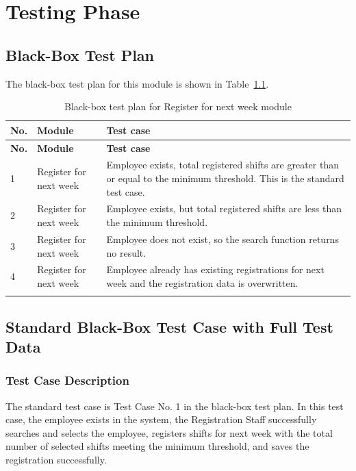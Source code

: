\chapter{Testing Phase}

\section{Black-Box Test Plan}



The black-box test plan for this module is shown in Table~\ref{tab:blackbox-test-plan}.

\begin{longtable}{|p{}|p{}|p{}|}
\hline
\textbf{No.} & \textbf{Module} & \textbf{Test case} \\
\hline
\endfirsthead
\hline
\textbf{No.} & \textbf{Module} & \textbf{Test case} \\
\hline
\endhead
1 & Register for next week & Employee exists, total registered shifts are greater than or equal to the minimum threshold. This is the standard test case. \\
\hline
2 & Register for next week & Employee exists, but total registered shifts are less than the minimum threshold. \\
\hline
3 & Register for next week & Employee does not exist, so the search function returns no result. \\
\hline
4 & Register for next week & Employee already has existing registrations for next week and the registration data is overwritten. \\
\hline
\caption{Black-box test plan for Register for next week module}\label{tab:blackbox-test-plan}
\end{longtable}

\section{Standard Black-Box Test Case with Full Test Data}

\subsection{Test Case Description}

The standard test case is Test Case No. 1 in the black-box test plan. In this test case, the employee exists in the system, the Registration Staff successfully searches and selects the employee, registers shifts for next week with the total number of selected shifts meeting the minimum threshold, and saves the registration successfully.

